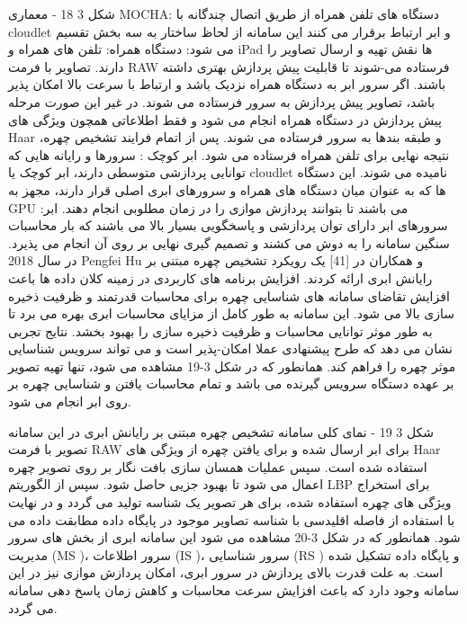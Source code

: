 شکل ‏3 18 - معماری MOCHA: دستگاه های تلفن همراه از طریق اتصال چندگانه با cloudlet و ابر ارتباط برقرار می کنند
این سامانه از لحاظ ساختار به سه بخش تقسیم می شود:
دستگاه همراه: تلفن های همراه و iPad ها نقش تهیه و ارسال تصاویر را دارند. تصاویر با فرمت RAW فرستاده می-شوند تا قابلیت پیش پردازش بهتری داشته باشند. اگر سرور ابر به دستگاه همراه نزدیک باشد و ارتباط با سرعت بالا امکان پذیر باشد، تصاویر پیش پردازش به سرور فرستاده می شوند. در غیر این صورت مرحله پیش پردازش در دستگاه همراه انجام می شود و فقط اطلاعاتی همچون ویژگی های Haar و طبقه بندها به سرور فرستاده  می شوند. پس از اتمام فرایند تشخیص چهره، نتیجه نهایی برای تلفن همراه فرستاده می شود.
ابر کوچک : سرورها و رایانه هایی که توانایی پردازشی متوسطی دارند، ابر کوچک یا cloudlet نامیده می شوند. این دستگاه ها که به عنوان میان دستگاه های همراه و سرورهای ابری اصلی قرار دارند، مجهز به GPU می باشند تا بتوانند پردازش موازی را در زمان مطلوبی انجام دهند.
ابر: سرورهای ابر دارای توان پردازشی و پاسخگویی بسیار بالا می باشند که بار محاسبات سنگین سامانه را به دوش می کشند و تصمیم گیری نهایی بر روی آن انجام می پذیرد.
در سال 2018 Pengfei Hu و همکاران در [41] یک رویکرد تشخیص چهره مبتنی بر رایانش ابری ارائه کردند. افزایش برنامه های کاربردی در زمینه کلان داده  ها باعث افزایش تقاضای سامانه های شناسایی چهره برای محاسبات قدرتمند و ظرفیت ذخیره سازی بالا می شود. این سامانه به طور کامل از مزایای محاسبات ابری بهره می برد تا به طور موثر توانایی محاسبات و ظرفیت ذخیره سازی را بهبود بخشد. نتایج تجربی نشان می دهد که طرح پیشنهادی عملا امکان-پذیر است و می تواند سرویس شناسایی موثر چهره را فراهم کند. همانطور که در شکل 3-19 مشاهده می شود، تنها تهیه تصویر بر عهده دستگاه سرویس گیرنده می باشد و تمام محاسبات یافتن و شناسایی چهره بر روی ابر انجام می شود.
 
شکل ‏3 19 - نمای کلی سامانه تشخیص چهره مبتنی بر رایانش ابری
در این سامانه تصویر با فرمت RAW برای ابر ارسال شده و برای یافتن چهره از ویژگی های Haar استفاده شده است. سپس عملیات همسان سازی بافت نگار بر روی تصویر چهره اعمال می شود تا بهبود جزیی حاصل شود. سپس از الگوریتم LBP  برای استخراج ویژگی های چهره استفاده شده، برای هر تصویر یک شناسه تولید می گردد و در نهایت با استفاده از فاصله اقلیدسی با شناسه تصاویر موجود در پایگاه داده مطابقت داده می شود. همانطور که در شکل 3-20 مشاهده می شود این سامانه ابری از بخش های سرور مدیریت (MS )، سرور اطلاعات (IS )، سرور شناسایی (RS ) و پایگاه داده تشکیل شده است. به علت قدرت بالای پردازش در سرور ابری، امکان پردازش موازی نیز در این سامانه وجود دارد که باعث افزایش سرعت محاسبات و کاهش زمان پاسخ دهی سامانه می گردد. 
 
